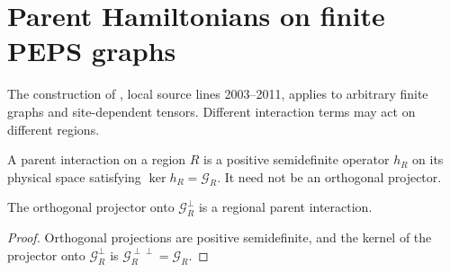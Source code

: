 \section{Parent Hamiltonians on finite PEPS graphs}%
\label{sec:peps_region_parent_hamiltonian}

The construction of \cite[Section~IV.C.1]{Cirac2021Matrix}, local source
lines 2003--2011, applies to arbitrary finite graphs and site-dependent
tensors. Different interaction terms may act on different regions.

\begin{definition}%
    \label{def:peps_region_parent_interaction}
    \leanok
    A parent interaction on a region $R$ is a positive semidefinite
    operator $h_R$ on its physical space satisfying
    $\ker h_R=\mathcal G_R$. It need not be an orthogonal projector.
\end{definition}

\begin{lemma}%
    \label{thm:peps_canonical_region_interaction}
    \leanok
    The orthogonal projector onto $\mathcal G_R^\perp$ is a regional
    parent interaction.
\end{lemma}

\begin{proof}\leanok
    Orthogonal projections are positive semidefinite, and the kernel
    of the projector onto $\mathcal G_R^\perp$ is
    $\mathcal G_R^{\perp\perp}=\mathcal G_R$.
\end{proof}

